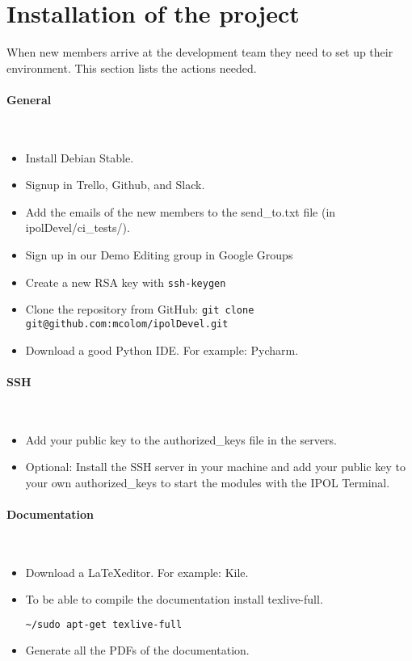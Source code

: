 \section{Installation of the project}
When new members arrive at the development team they need to set up their environment. This section lists the actions needed.

\paragraph{General} \hspace{0pt} \\
\begin{itemize}
 \item Install Debian Stable.
 \item Signup in Trello, Github, and Slack.
 \item Add the emails of the new members to the send\_to.txt file (in ipolDevel/ci\_tests/).
 \item Sign up in our Demo Editing group in Google Groups
 \item Create a new RSA key with {\tt ssh-keygen}
 \item Clone the repository from GitHub: {\tt git clone git@github.com:mcolom/ipolDevel.git}
 \item Download a good Python IDE. For example: Pycharm.
\end{itemize}

\paragraph{SSH} \hspace{0pt} \\
\begin{itemize}
 \item Add your public key to the authorized\_keys file in the servers.
 \item Optional: Install the SSH server in your machine and add your public key to your own authorized\_keys to start the modules with the IPOL Terminal.
\end{itemize}

\paragraph{Documentation} \hspace{0pt} \\
\begin{itemize}
 \item Download a \LaTeX editor. For example: Kile.
 \item To be able to compile the documentation install texlive-full.
  \begin{lstlisting}[language=Bash]
  ~/sudo apt-get texlive-full
  \end{lstlisting}
 \item Generate all the PDFs of the documentation.
\end{itemize}

